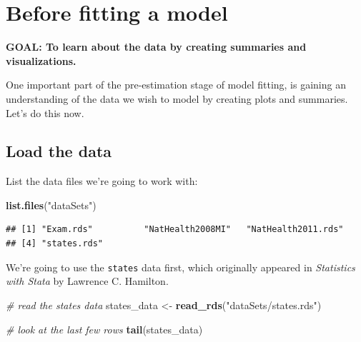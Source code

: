\documentclass[
]{book}
\newenvironment{Shaded}{\begin{snugshade}}{\end{snugshade}}
\newcommand{\CommentTok}[1]{\textcolor[rgb]{0.56,0.35,0.01}{\textit{#1}}}
\newcommand{\KeywordTok}[1]{\textcolor[rgb]{0.13,0.29,0.53}{\textbf{#1}}}
\newcommand{\NormalTok}[1]{#1}
\newcommand{\StringTok}[1]{\textcolor[rgb]{0.31,0.60,0.02}{#1}}
\begin{document}
\hypertarget{before-fitting-a-model}{%
\section{Before fitting a model}\label{before-fitting-a-model}}

\begin{alert}

\textbf{GOAL: To learn about the data by creating summaries and visualizations.}

\end{alert}

One important part of the pre-estimation stage of model fitting, is gaining an understanding
of the data we wish to model by creating plots and summaries. Let's do this now.

\hypertarget{load-the-data}{%
\subsection{Load the data}\label{load-the-data}}

List the data files we're going to work with:

\begin{Shaded}
\begin{Highlighting}[]
\KeywordTok{list.files}\NormalTok{(}\StringTok{"dataSets"}\NormalTok{)}
\end{Highlighting}
\end{Shaded}

\begin{verbatim}
## [1] "Exam.rds"          "NatHealth2008MI"   "NatHealth2011.rds"
## [4] "states.rds"
\end{verbatim}

We're going to use the \texttt{states} data first, which originally appeared in \emph{Statistics with Stata} by Lawrence C. Hamilton.

\begin{Shaded}
\begin{Highlighting}[]
  \CommentTok{\# read the states data}
\NormalTok{  states\_data \textless{}{-}}\StringTok{ }\KeywordTok{read\_rds}\NormalTok{(}\StringTok{"dataSets/states.rds"}\NormalTok{)}

  \CommentTok{\# look at the last few rows}
  \KeywordTok{tail}\NormalTok{(states\_data)}
\end{Highlighting}
\end{Shaded}
\end{document}
